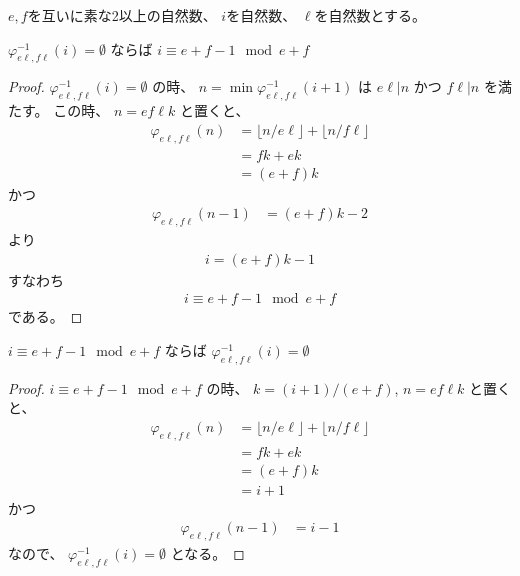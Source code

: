 $e, f$を互いに素な2以上の自然数、
$i$を自然数、
$\ell$を自然数とする。

\begin{lemma}
\label{lm:φinv_i_empty_i_mod_e_add_f}
$
\varphi_{e \ell, f \ell}^{-1}(i) = \emptyset
$
ならば
$
i \equiv e + f - 1 \mod e + f
$
\end{lemma}

\begin{proof}
$
\varphi_{e \ell, f \ell}^{-1}(i) = \emptyset
$
の時、
$
n = \min \varphi_{e \ell, f \ell}^{-1}(i+1)
$
は
$
e \ell | n
$
かつ
$
f \ell | n
$
を満たす。
この時、
$
n = e f \ell k
$
と置くと、
\begin{align}
\varphi_{e \ell, f \ell}(n)
&= \lfloor n / e \ell \rfloor + \lfloor n / f \ell \rfloor \\
&= f k + e k \\
&= (e + f) k
\end{align}
かつ
\begin{align}
\varphi_{e \ell, f \ell}(n-1)
&= (e + f) k - 2
\end{align}
より
\begin{align}
i = (e + f) k - 1
\end{align}
すなわち
\begin{align}
i \equiv e + f - 1 \mod e + f
\end{align}
である。
\end{proof}

\begin{lemma}
\label{lm:i_mod_e_add_f_φinv_i_empty}
$
i \equiv e + f - 1 \mod e + f
$
ならば
$
\varphi_{e \ell, f \ell}^{-1}(i) = \emptyset
$
\end{lemma}

\begin{proof}
$
i \equiv e + f - 1 \mod e + f
$
の時、
$
k = (i + 1) / (e + f)
$,
$
n = e f \ell k
$
と置くと、
\begin{align}
\varphi_{e \ell, f \ell}(n)
&= \lfloor n / e \ell \rfloor + \lfloor n / f \ell \rfloor \\
&= f k + e k \\
&= (e + f) k \\
&= i + 1
\end{align}
かつ
\begin{align}
\varphi_{e \ell, f \ell}(n-1)
&= i - 1
\end{align}
なので、
$
\varphi_{e \ell, f \ell}^{-1}(i) = \emptyset
$
となる。
\end{proof}

